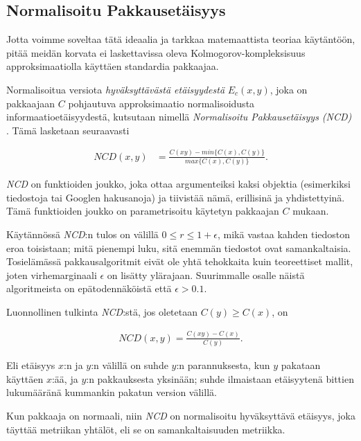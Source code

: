 \documentclass[12pt,finnish,final]{tktltiki2}
\theoremstyle{definition}
\theoremstyle{remark}
\begin{document}
\subsection{Normalisoitu Pakkausetäisyys} %
\label{sub:normalisoitu_pakkausetaisyys}

  Jotta voimme soveltaa tätä ideaalia ja tarkkaa matemaattista teoriaa käytäntöön, pitää meidän korvata ei laskettavissa oleva Kolmogorov-kompleksisuus approksimaatiolla käyttäen standardia pakkaajaa.

  Normalisoitua versiota \emph{hyväksyttävästä etäisyydestä} $E_c(x,y)$, joka on pakkaajaan $C$ pohjautuva approksimaatio normalisoidusta informaatioetäisyydestä, kutsutaan nimellä \emph{Normalisoitu Pakkausetäisyys (NCD)} \cite{CV05}.
  Tämä lasketaan seuraavasti

  \begin{align}
    NCD(x,y) &= \frac{C(xy)-min\{C(x),C(y)\}}{max\{C(x),C(y)\}}.
  \end{align}

  \emph{NCD} on funktioiden joukko, joka ottaa argumenteiksi kaksi objektia (esimerkiksi tiedostoja tai Googlen hakusanoja) ja tiivistää nämä, erillisinä ja yhdistettyinä.
  Tämä funktioiden joukko on parametrisoitu käytetyn pakkaajan $C$ mukaan.

  Käytännössä \emph{NCD}:n tulos on välillä $0 \leq r \leq 1+ \epsilon$, mikä vastaa kahden tiedoston eroa toisistaan; mitä pienempi luku, sitä enemmän tiedostot ovat samankaltaisia.
  Tosielämässä pakkausalgoritmit eivät ole yhtä tehokkaita kuin teoreettiset mallit, joten virhemarginaali $\epsilon$ on lisätty ylärajaan.
  Suurimmalle osalle näistä algoritmeista on epätodennäköistä että  $\epsilon > 0.1$.

  Luonnollinen tulkinta \emph{NCD}:stä, jos oletetaan $C(y) \geq C(x)$, on

  \begin{align}
    NCD(x,y) = \frac{C(xy)-C(x)}{C(y)}.
  \end{align}

  Eli etäisyys $x$:n ja $y$:n välillä on suhde $y$:n parannuksesta, kun $y$ pakataan käyttäen $x$:ää, ja $y$:n pakkauksesta yksinään; suhde ilmaistaan etäisyytenä bittien lukumääränä kummankin pakatun version välillä.

  Kun pakkaaja on normaali, niin \emph{NCD} on normalisoitu hyväksyttävä etäisyys, joka täyttää metriikan yhtälöt, eli se on samankaltaisuuden metriikka.
\end{document}
